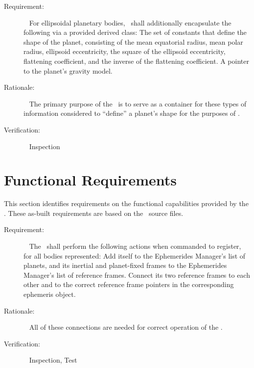 \label{reqt:ellip_planet_data_encapsulation}
\begin{description}
  \item[Requirement:]\ \newline
    For ellipsoidal planetary bodies, \planetDesc\ shall additionally
    encapsulate the following via a provided derived class:
    The set of constants that define the shape of the planet, consisting of
    the mean equatorial radius, mean polar radius, ellipsoid eccentricity,
    the square of the ellipsoid eccentricity, flattening coefficient, and
    the inverse of the flattening coefficient.
    A pointer to the planet's gravity model.

  \item[Rationale:]\ \newline
    The primary purpose of the \planetDesc\ is to serve as
    a container for these types of information considered
    to ``define'' a planet's shape for the purposes of \JEODid.

  \item[Verification:]\ \newline
    Inspection
\end{description}


\section{Functional Requirements}\label{sec:func_reqts}
This section identifies requirements on the functional 
capabilities provided by the \planetDesc.  
These as-built requirements are based on the \planetDesc\ source files.

\label{reqt:func_base_register_model}
\begin{description}
  \item[Requirement:]\ \newline
    The \planetDesc\ shall perform the following actions
    when commanded to register, for all bodies represented:
    Add itself to the Ephemerides Manager's list of planets, and its
    inertial and planet-fixed frames to the Ephemerides Manager's
    list of reference frames.
    Connect its two reference frames to each other and to the correct
    reference frame pointers in the corresponding ephemeris object.

  \item[Rationale:]\ \newline
    All of these connections are needed for correct operation of the \planetDesc.

  \item[Verification:]\ \newline
    Inspection, Test
\end{description}

